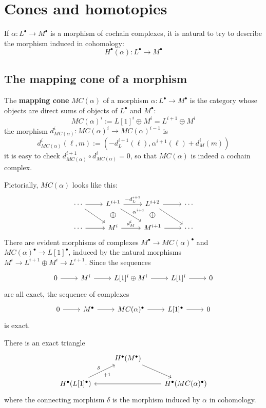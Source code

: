 \section{Cones and homotopies}
If $\alpha:L^\bullet\to M^\bullet$ is a morphism of cochain complexes, it is natural to try to describe the morphism induced in cohomology:
\[H^\bullet(\alpha):L^\bullet\to M^\bullet\]
\subsection{The mapping cone of a morphism}
\begin{definition}
The \textbf{mapping cone} $MC(\alpha)$ of a morphism $\alpha:L^\bullet\to M^\bullet$ is the category whose objects are direct sums of objects of $L^\bullet$ and $M^\bullet$:
\[MC(\alpha)^i:=L[1]^i\oplus M^i=L^{i+1}\oplus M^i\]
the morphism $d^i_{MC(\alpha)}:MC(\alpha)^i\to　MC(\alpha)^{i-1}$ is
\[d_{MC(\alpha)}^i(\ell,m):=(-d_L^{i+1}(\ell),\alpha^{i+1}(\ell)+d_M^i(m))\]
it is easy to check $d_{MC(\alpha)}^{i+1}\circ d_{MC(\alpha)}^i=0$, so that $MC(\alpha)$ is indeed a cochain complex.
\end{definition}
Pictorially, $MC(\alpha)$ looks like this:
\[\begin{tikzcd}
\cdots\ar[rd]\ar[r]&L^{i+1}\ar[draw=none]{d}[name=X, anchor=center,scale=1.5]{\oplus}\ar[r,"-d_L^{i+1}"]\ar[rd,"\alpha^{i+1}"]&L^{i+2}\ar[draw=none]{d}[name=X, anchor=center,scale=1.5]{\oplus}\ar[rd]\ar[r]&\cdots\\
\cdots\ar[r]&M^i\ar[r,"d_M^i"]&M^{i+1}\ar[r]&\cdots
\end{tikzcd}\]
There are evident morphisms of complexes $M^\bullet\to MC(\alpha)^\bullet$ and $MC(\alpha)^\bullet\to L[1]^\bullet$, induced by the natural morphisms $M^i\to L^{i+1}\oplus M^i\to L^{i+1}$. Since the sequences
\[\begin{tikzcd}
0\rar&M^i\rar&L[1]^i\oplus M^i\rar&L[1]^i\rar&0
\end{tikzcd}\]
are all exact, the sequence of complexes
\[\begin{tikzcd}
0\ar[r]&M^\bullet\ar[r]&MC(\alpha)^\bullet\ar[r]&L[1]^\bullet\ar[r]&0
\end{tikzcd}\]
is exact.
\begin{proposition}
There is an exact triangle
\[\begin{tikzcd}
&H^\bullet(M^\bullet)\ar[rd]&\\
H^\bullet(L[1]^\bullet)\ar[ru,"\delta","+1"']&&H^\bullet(MC(\alpha)^\bullet)\ar[ll]
\end{tikzcd}\]
where the connecting morphism $\delta$ is the morphism induced by $\alpha$ in cohomology.
\end{proposition}
